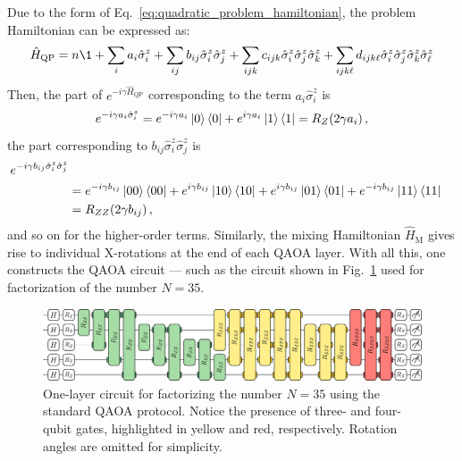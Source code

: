 Due to the form of Eq.~\ref{eq:quadratic_problem_hamiltonian}, the problem Hamiltonian can be expressed as:
\begin{equation}
    \hat{H}_\mathrm{QP} = n \1 + \sum_i a_i \hat{\sigma}^z_i
    + \sum_{ij} b_{ij} \hat{\sigma}^z_i \hat{\sigma}^z_j
    + \sum_{ijk} c_{ijk} \hat{\sigma}^z_i \hat{\sigma}^z_j \hat{\sigma}^z_k
    + \sum_{ijk\ell} d_{ijk\ell} \hat{\sigma}^z_i \hat{\sigma}^z_j \hat{\sigma}^z_k \hat{\sigma}^z_\ell
    \label{eq:expanded_problem_quadratic_hamiltonian}
\end{equation}
Then, the part of $e^{-i \gamma \hat{H}_\mathrm{QP}}$ corresponding to the term $a_i \hat{\sigma}^z_i$ is
\begin{equation}
    e^{-i \gamma a_i \hat{\sigma}^z_i} = e^{-i \gamma a_i} \ket{0}\bra{0}
    + e^{i \gamma a_i} \ket{1}\bra{1}
    = R_Z(2 \gamma a_i)\,,
\end{equation}
the part corresponding to $b_{ij} \hat{\sigma}^z_i \hat{\sigma}^z_j$ is
\begin{equation}
    \begin{split}
        e^{-i \gamma b_{ij} \hat{\sigma}^z_i \hat{\sigma}^z_j} \\
         &=e^{-i\gamma b_{ij}} \ket{00}\bra{00} + e^{i\gamma b_{ij}} \ket{10}\bra{10}
        +  e^{i\gamma b_{ij}} \ket{01}\bra{01} + e^{-i\gamma b_{ij}} \ket{11}\bra{11} \\
        &= R_{ZZ} (2 \gamma b_{ij})\,,
    \end{split}
\end{equation}
and so on for the higher-order terms. Similarly, the mixing Hamiltonian $\hat{H}_\mathrm{M}$ gives rise to individual X-rotations at the end of each QAOA layer. With all this, one constructs the QAOA circuit --- such as the circuit shown in Fig.~\ref{fig:standard_circuit} used for factorization of the number $N=35$.

\begin{figure}[h]
    \centering
    \includegraphics[width=1\textwidth]{02-factorization/figs/standard_circuit_35.pdf}
    \caption{One-layer circuit for factorizing the number $N=35$ using the standard QAOA protocol. Notice the presence
    of three- and four-qubit gates, highlighted in yellow and red, respectively. Rotation angles are omitted for simplicity.}
    \label{fig:standard_circuit}
\end{figure}

